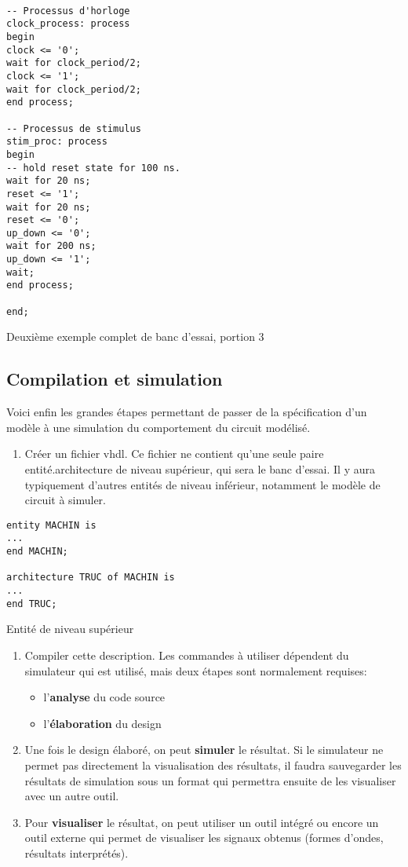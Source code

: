 \documentclass[11pt]{article}
\begin{document}
\begin{listing}[htbp]
\begin{verbatim}

-- Processus d'horloge
clock_process: process
begin
clock <= '0';
wait for clock_period/2;
clock <= '1';
wait for clock_period/2;
end process;

-- Processus de stimulus
stim_proc: process
begin
-- hold reset state for 100 ns.
wait for 20 ns;
reset <= '1';
wait for 20 ns;
reset <= '0';
up_down <= '0';
wait for 200 ns;
up_down <= '1';
wait;
end process;

end;
\end{verbatim}
\caption{Deuxième exemple complet de banc d'essai, portion 3}
\end{listing}


\subsection{Compilation et simulation}
\label{sec:org4c035a1}

Voici enfin les grandes étapes permettant de passer de la spécification d'un
modèle à une simulation du comportement du circuit modélisé. 

\begin{enumerate}
\item Créer un fichier vhdl. Ce fichier ne contient qu'une seule paire
entité.architecture de niveau supérieur, qui sera le banc
d'essai. Il y aura typiquement d'autres entités de niveau
inférieur, notamment le modèle de circuit à simuler.
\end{enumerate}

\begin{listing}[htbp]
\begin{verbatim}
entity MACHIN is
...
end MACHIN;

architecture TRUC of MACHIN is
...
end TRUC;
\end{verbatim}
\caption{Entité de niveau supérieur}
\end{listing}

\begin{enumerate}
\item Compiler cette description. Les commandes à utiliser dépendent du
simulateur qui est utilisé, mais deux étapes sont normalement
requises:
\begin{itemize}
\item l'\textbf{analyse} du code source
\item l'\textbf{élaboration} du design
\end{itemize}

\item Une fois le design élaboré, on peut \textbf{simuler} le résultat. Si le
simulateur ne permet pas directement la visualisation des
résultats, il faudra sauvegarder les résultats de simulation sous un
format qui permettra ensuite de les visualiser avec un autre outil.

\item Pour \textbf{visualiser} le résultat, on peut utiliser un outil intégré ou encore un
outil externe qui permet de visualiser les signaux obtenus (formes d'ondes,
résultats interprétés).
\end{enumerate}
\end{document}
